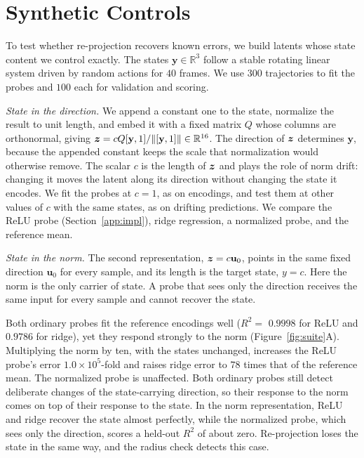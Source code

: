 \section{Synthetic Controls}
\label{app:synthetic}
To test whether re-projection recovers known errors, we build latents whose state content we control exactly. The states $\mathbf y\in\mathbb R^3$ follow a stable rotating linear system driven by random actions for $40$ frames. We use $300$ trajectories to fit the probes and $100$ each for validation and scoring.

\emph{State in the direction.} We append a constant one to the state, normalize the result to unit length, and embed it with a fixed matrix $Q$ whose columns are orthonormal, giving $\bm{z}=cQ[\mathbf y,1]/\|[\mathbf y,1]\|\in\mathbb R^{16}$. The direction of $\bm{z}$ determines $\mathbf y$, because the appended constant keeps the scale that normalization would otherwise remove. The scalar $c$ is the length of $\bm{z}$ and plays the role of norm drift: changing it moves the latent along its direction without changing the state it encodes. We fit the probes at $c=1$, as on encodings, and test them at other values of $c$ with the same states, as on drifting predictions. We compare the ReLU probe (Section~\ref{app:impl}), ridge regression, a normalized probe, and the reference mean.

\emph{State in the norm.} The second representation, $\bm{z}=c\mathbf u_0$, points in the same fixed direction $\mathbf u_0$ for every sample, and its length is the target state, $y=c$. Here the norm is the only carrier of state. A probe that sees only the direction receives the same input for every sample and cannot recover the state.

Both ordinary probes fit the reference encodings well ($R^2=$ $0.9998$ for ReLU and $0.9786$ for ridge), yet they respond strongly to the norm (Figure~\ref{fig:suite}A). Multiplying the norm by ten, with the states unchanged, increases the ReLU probe's error $1.0\times10^{5}$-fold and raises ridge error to $78$ times that of the reference mean. The normalized probe is unaffected. Both ordinary probes still detect deliberate changes of the state-carrying direction, so their response to the norm comes on top of their response to the state. In the norm representation, ReLU and ridge recover the state almost perfectly, while the normalized probe, which sees only the direction, scores a held-out $R^2$ of about zero. Re-projection loses the state in the same way, and the radius check detects this case.

